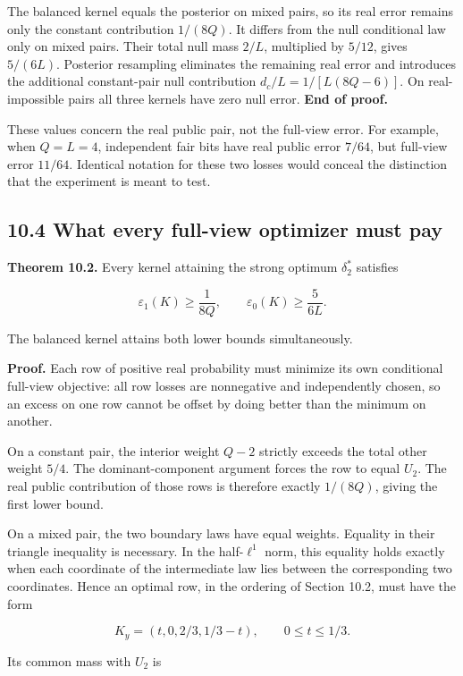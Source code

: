 \documentclass[
]{article}
\begin{document}
The balanced kernel equals the posterior on mixed pairs, so its real
error remains only the constant contribution \(1/(8Q)\). It differs from
the null conditional law only on mixed pairs. Their total null mass
\(2/L\), multiplied by \(5/12\), gives \(5/(6L)\). Posterior resampling
eliminates the remaining real error and introduces the additional
constant-pair null contribution \(d_c/L=1/[L(8Q-6)]\). On
real-impossible pairs all three kernels have zero null error.
\textbf{End of proof.}

These values concern the real public pair, not the full-view error. For
example, when \(Q=L=4\), independent fair bits have real public error
\(7/64\), but full-view error \(11/64\). Identical notation for these
two losses would conceal the distinction that the experiment is meant to
test.

\subsection{10.4 What every full-view optimizer must
pay}\label{what-every-full-view-optimizer-must-pay}

\textbf{Theorem 10.2.} Every kernel attaining the strong optimum
\(\delta_2^*\) satisfies

\[
\varepsilon_1(K)\ge\frac1{8Q},\qquad
\varepsilon_0(K)\ge\frac5{6L}.
\]

The balanced kernel attains both lower bounds simultaneously.

\textbf{Proof.} Each row of positive real probability must minimize its
own conditional full-view objective: all row losses are nonnegative and
independently chosen, so an excess on one row cannot be offset by doing
better than the minimum on another.

On a constant pair, the interior weight \(Q-2\) strictly exceeds the
total other weight \(5/4\). The dominant-component argument forces the
row to equal \(U_2\). The real public contribution of those rows is
therefore exactly \(1/(8Q)\), giving the first lower bound.

On a mixed pair, the two boundary laws have equal weights. Equality in
their triangle inequality is necessary. In the half-\(\ell^1\) norm,
this equality holds exactly when each coordinate of the intermediate law
lies between the corresponding two coordinates. Hence an optimal row, in
the ordering of Section 10.2, must have the form

\[
K_y=(t,0,2/3,1/3-t),\qquad 0\le t\le1/3.
\]

Its common mass with \(U_2\) is
\end{document}
